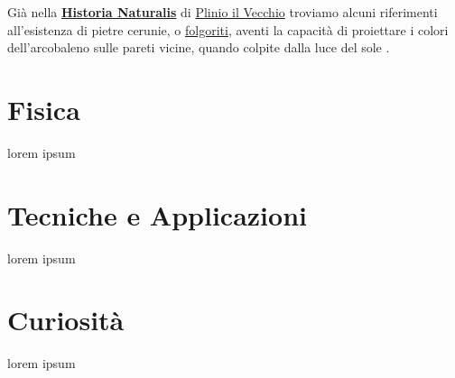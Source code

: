 \documentclass[12pt,a4paper, titlepage, oneside]{article}
\begin{document}
    Già nella \href{https://it.wikipedia.org/wiki/Naturalis_historia}{\textbf{Historia Naturalis}} di \href{https://it.wikipedia.org/wiki/Plinio_il_Vecchio}{Plinio il Vecchio} troviamo alcuni riferimenti all'esistenza di pietre cerunie, o \href{https://it.wikipedia.org/wiki/Folgorite}{folgoriti}, aventi la capacità di proiettare i colori dell'arcobaleno sulle pareti vicine, quando colpite dalla luce del sole \cite{naturalisHistoria}.\\
    
    \clearpage

    \section{Fisica}
    lorem ipsum
    \clearpage

    \section{Tecniche e Applicazioni}
    lorem ipsum
    \clearpage

    \section{Curiosità}
    lorem ipsum
    \clearpage

    \printbibliography
    \clearpage

    
\end{document}
